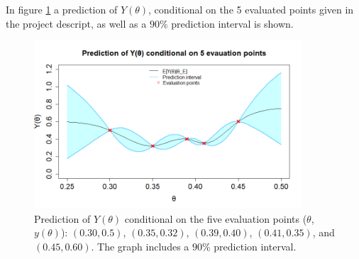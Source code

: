 
 In figure \ref{2afiveeval} a prediction of $Y(\theta)$, conditional on the 5 evaluated points given in the project descript, as well as a $90\%$ prediction interval is shown.
 
\begin{figure}
    \centering
    \includegraphics[width=100mm]{2aPlot.png}
    \caption{Prediction of $Y(\theta)$ conditional on the five evaluation points  ($\theta$, $y(\theta)$): $(0.30,0.5)$, $(0.35,0.32)$, $(0.39,0.40)$, $(0.41,0.35)$, and $(0.45,0.60)$. The graph includes a $90\%$ prediction interval. }
    \label{2afiveeval}
\end{figure}


